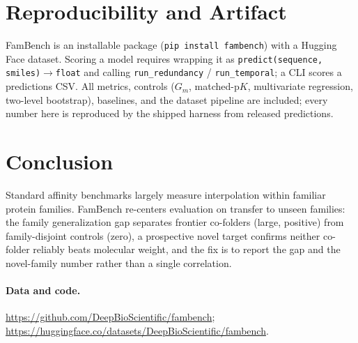 \documentclass[11pt]{article}
\begin{document}
\section{Reproducibility and Artifact}

FamBench is an installable package (\texttt{pip install fambench}) with a Hugging Face dataset.
Scoring a model requires wrapping it as \texttt{predict(sequence, smiles)$\to$float} and calling
\texttt{run\_redundancy} / \texttt{run\_temporal}; a CLI scores a predictions CSV. All metrics,
controls ($G_m$, matched-$\mathrm{p}K$, multivariate regression, two-level bootstrap), baselines,
and the dataset pipeline are included; every number here is reproduced by the shipped harness from
released predictions.

\section{Conclusion}

Standard affinity benchmarks largely measure interpolation within familiar protein families.
FamBench re-centers evaluation on transfer to unseen families: the family generalization gap
separates frontier co-folders (large, positive) from family-disjoint controls (zero), a
prospective novel target confirms neither co-folder reliably beats molecular weight, and the fix
is to report the gap and the novel-family number rather than a single correlation.

\paragraph{Data and code.} \url{https://github.com/DeepBioScientific/fambench};
\url{https://huggingface.co/datasets/DeepBioScientific/fambench}.

{\small


}
\end{document}
